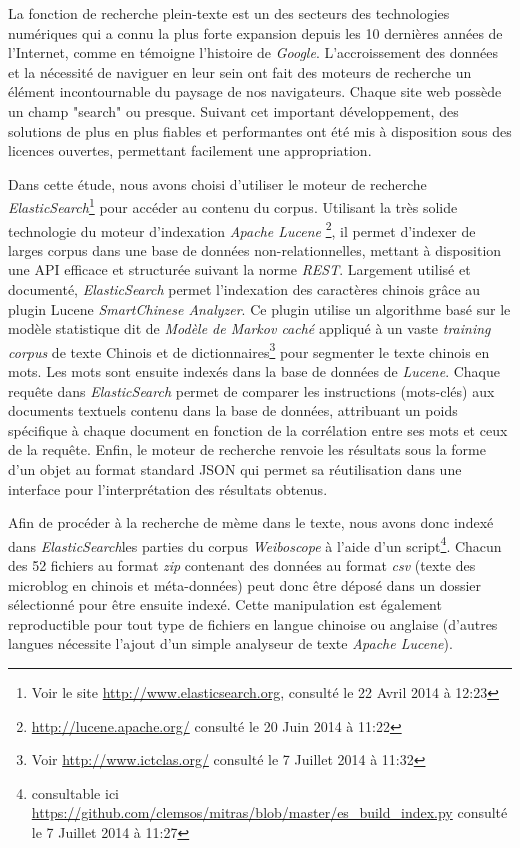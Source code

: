 La fonction de recherche plein-texte est un des secteurs des technologies numériques qui a connu la plus forte expansion depuis les 10 dernières années de l'Internet, comme en témoigne l'histoire de \textit{Google}. L'accroissement des données et la nécessité de naviguer en leur sein ont fait des moteurs de recherche un élément incontournable du paysage de nos navigateurs. Chaque site web possède un champ "search" ou presque. Suivant cet important développement, des solutions de plus en plus fiables et performantes ont été mis à disposition sous des licences ouvertes, permettant facilement une appropriation.

Dans cette étude, nous avons choisi d'utiliser le moteur de recherche \textit{ElasticSearch}\footnote{Voir le site \url{http://www.elasticsearch.org}, consulté le 22 Avril 2014 à 12:23} pour accéder au contenu du corpus. Utilisant la très solide technologie du  moteur d'indexation \textit{Apache Lucene}  \footnote{ \url{http://lucene.apache.org/} consulté le 20 Juin 2014 à 11:22}, il permet d'indexer de larges corpus dans une base de données non-relationnelles, mettant à disposition une API efficace et structurée suivant la norme \textit{REST}. Largement utilisé et documenté, \textit{ElasticSearch} permet l'indexation des caractères chinois grâce au plugin Lucene \textit{SmartChinese Analyzer}. Ce plugin utilise un algorithme basé sur le modèle statistique dit de \textit{Modèle de Markov caché} appliqué à un vaste \textit{training corpus} de texte Chinois et de dictionnaires\footnote{Voir \url{http://www.ictclas.org/} consulté le 7 Juillet 2014 à 11:32} pour segmenter le texte chinois en mots. Les mots sont ensuite indexés dans la base de données de \textit{Lucene}. Chaque requête dans \textit{ElasticSearch} permet de comparer les instructions (mots-clés) aux documents textuels contenu dans la base de données, attribuant un poids spécifique à chaque document en fonction de la corrélation entre ses mots et ceux de la requête. Enfin, le moteur de recherche renvoie les résultats sous la forme d'un objet au format standard JSON qui permet sa réutilisation dans une interface pour l'interprétation des résultats obtenus.

Afin de procéder à la recherche de mème dans le texte, nous avons donc indexé dans \textit{ElasticSearch}les parties du corpus \textit{Weiboscope} à l'aide d'un script\footnote{consultable ici \url{https://github.com/clemsos/mitras/blob/master/es_build_index.py} consulté le 7 Juillet 2014 à 11:27}. Chacun des 52 fichiers au format \textit{zip} contenant des données au format \textit{csv} (texte des microblog en chinois et méta-données)  peut donc être déposé dans un dossier sélectionné pour être ensuite indexé. Cette manipulation est également reproductible pour tout type de fichiers en langue chinoise ou anglaise (d'autres langues nécessite l'ajout d'un simple analyseur de texte \textit{Apache Lucene}).

